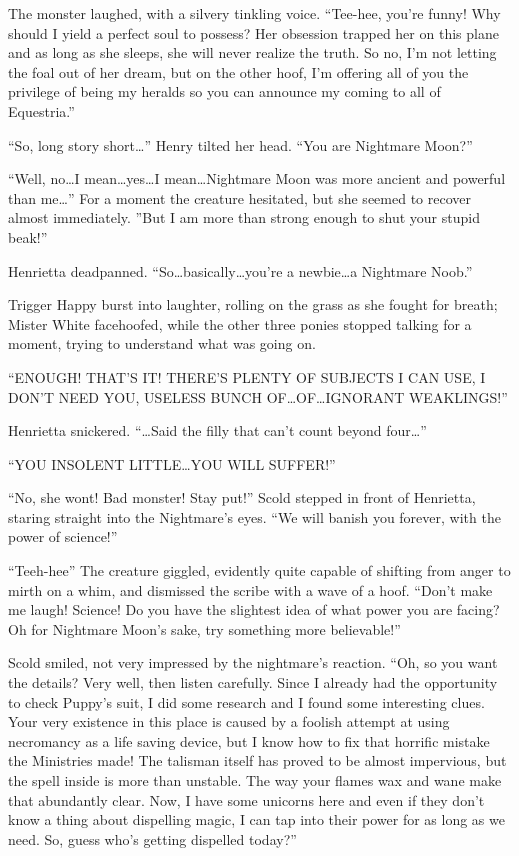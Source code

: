 The monster laughed, with a silvery tinkling voice. ``Tee-hee, you're funny! Why should I yield a perfect soul to possess? Her obsession trapped her on this plane and as long as she sleeps, she will never realize the truth. So no, I'm not letting the foal out of her dream, but on the other hoof, I'm offering all of you the privilege of being my heralds so you can announce my coming to all of Equestria.''

``So, long story short\dots'' Henry tilted her head. ``You are Nightmare Moon?''

``Well, no\dots I mean\dots yes\dots I mean\dots Nightmare Moon was more ancient and powerful than me\dots'' For a moment the creature hesitated, but she seemed to recover almost immediately. ''But I am more than strong enough to shut your stupid beak!''

Henrietta deadpanned. ``So\dots basically\dots you're a newbie\dots a Nightmare Noob.''

Trigger Happy burst into laughter, rolling on the grass as she fought for breath; Mister White facehoofed, while the other three ponies stopped talking for a moment, trying to understand what was going on.

``ENOUGH! THAT'S IT! THERE'S PLENTY OF SUBJECTS I CAN USE, I DON'T NEED YOU, USELESS BUNCH OF\dots OF\dots IGNORANT WEAKLINGS!''

Henrietta snickered. ``\dots Said the filly that can't count beyond four\dots''

``YOU INSOLENT LITTLE\dots YOU WILL SUFFER!''

``No, she wont! Bad monster! Stay put!'' Scold stepped in front of Henrietta, staring straight into the Nightmare's eyes. ``We will banish you forever, with the power of science!''

``Teeh-hee'' The creature giggled, evidently quite capable of shifting from anger to mirth on a whim, and dismissed the scribe with a wave of a hoof. ``Don't make me laugh! Science! Do you have the slightest idea of what power you are facing? Oh for Nightmare Moon's sake, try something more believable!''

Scold smiled, not very impressed by the nightmare's reaction. ``Oh, so you want the details? Very well, then listen carefully. Since I already had the opportunity to check Puppy's suit, I did some research and I found some interesting clues. Your very existence in this place is caused by a foolish attempt at using necromancy as a life saving device, but I know how to fix that horrific mistake the Ministries made! The talisman itself has proved to be almost impervious, but the spell inside is more than unstable. The way your flames wax and wane make that abundantly clear. Now, I have some unicorns here and even if they don't know a thing about dispelling magic, I can tap into their power for as long as we need. So, guess who's getting dispelled today?''

